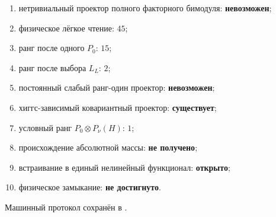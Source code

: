 \begin{protocol}
\begin{enumerate}
 \item нетривиальный проектор полного факторного бимодуля:
 \textbf{невозможен};
 \item физическое лёгкое чтение: \textbf{$45$};
 \item ранг после одного $P_0$: \textbf{$15$};
 \item ранг после выбора $L_L$: \textbf{$2$};
 \item постоянный слабый ранг-один проектор: \textbf{невозможен};
 \item хиггс-зависимый ковариантный проектор: \textbf{существует};
 \item условный ранг $P_0\otimes P_\nu(H)$: \textbf{$1$};
 \item происхождение абсолютной массы: \textbf{не получено};
 \item встраивание в единый нелинейный функционал: \textbf{открыто};
 \item физическое замыкание: \textbf{не достигнуто}.
\end{enumerate}
\end{protocol}

Машинный протокол сохранён в
.